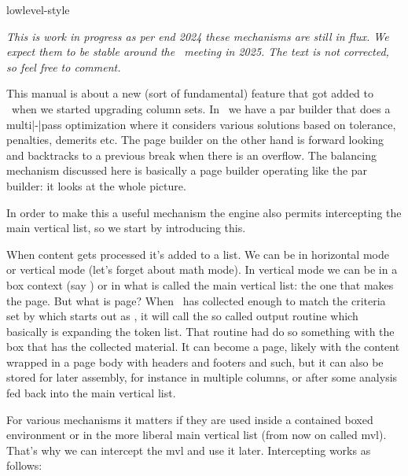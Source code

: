 
\environment lowlevel-style

\startdocument
  [title=balancing,
   color=middlecyan]

\startsectionlevel[title=Introduction]

{\em This is work in progress as per end 2024 these mechanisms are still in flux.
We expect them to be stable around the \CONTEXT\ meeting in 2025. The text is not
corrected, so feel free to comment.}

This manual is about a new (sort of fundamental) feature that got added to
\LUAMETATEX\ when we started upgrading column sets. In \TEX\ we have a par
builder that does a multi|-|pass optimization where it considers various
solutions based on tolerance, penalties, demerits etc. The page builder on the
other hand is forward looking and backtracks to a previous break when there is an
overflow. The balancing mechanism discussed here is basically a page builder
operating like the par builder: it looks at the whole picture.

In order to make this a useful mechanism the engine also permits intercepting the
main vertical list, so we start by introducing this.

\stopsectionlevel

\startsectionlevel[title=Intercepting the MVL]

When content gets processed it's added to a list. We can be in horizontal mode or
vertical mode (let's forget about math mode). In vertical mode we can be in a box
context (say \type {\vbox}) or in what is called the main vertical list: the one
that makes the page. But what is page? When \TEX\ has collected enough to match
the criteria set by \type {\pagegoal} which starts out as \type {\vsize}, it will
call the so called output routine which basically is expanding the \type
{\output} token list. That routine had do so something with the box that has the
collected material. It can become a page, likely with the content wrapped in a
page body with headers and footers and such, but it can also be stored for later
assembly, for instance in multiple columns, or after some analysis fed back into
the main vertical list.

For various mechanisms it matters if they are used inside a contained boxed
environment or in the more liberal main vertical list (from now on called mvl).
That's why we can intercept the mvl and use it later. Intercepting works as
follows:

